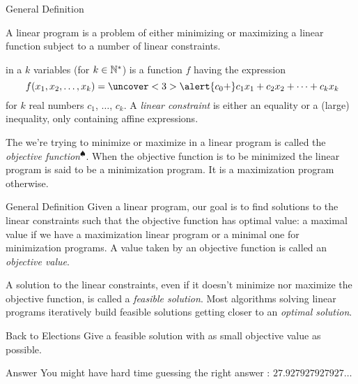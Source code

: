 \documentclass[aspectratio = 169]{beamer}
\begin{document}
\begin{frame}{General Definition}
\begin{defn}
  A linear program is a problem of either minimizing or maximizing a
  linear function subject to a number of linear constraints.
\end{defn}
 in a $k$ variables (for $k \in \mathbb{N}^*$) is a function $f$
having the expression
    \[
\        f(x_1, x_2, \ldots, x_k) = \uncover<3>{\alert{c_0 + }} c_1x_1 + c_2x_2 + \cdots + c_kx_k
    \]
    for $k$ real numbers $c_1$, $\ldots$, $c_k$. A \emph{linear
      constraint} is either an equality or a (large) inequality, only
    containing affine expressions.

    \pause
    The  we're trying to minimize or maximize in a linear
    program is called the \emph{objective
      function}$^{\spadesuit}$. When the objective function is to be
    minimized the linear program is said to be a minimization
    program. It is a maximization program otherwise.
\end{frame}

\begin{frame}{General Definition}
  Given a linear program, our goal is to find solutions to the linear
  constraints such that the objective function has optimal value: a
  maximal value if we have a maximization linear program or a minimal
  one for minimization programs. A value taken by an objective
  function is called an \emph{objective value}.

  \pause
  A solution to the linear constraints, even if it doesn't minimize
  nor maximize the objective function, is called a \emph{feasible
    solution}. Most algorithms solving linear programs iteratively
  build feasible solutions getting closer to an \emph{optimal
    solution}.
  \pause
    \begin{halfshyblock}{Back to Elections}
        Give a feasible solution with as small objective value as possible.
    \end{halfshyblock}
    \pause
    \begin{alertblock}{Answer}
      You might have hard time guessing the right answer : $27.927927927927\ldots$
    \end{alertblock}
\end{frame}
\end{document}
